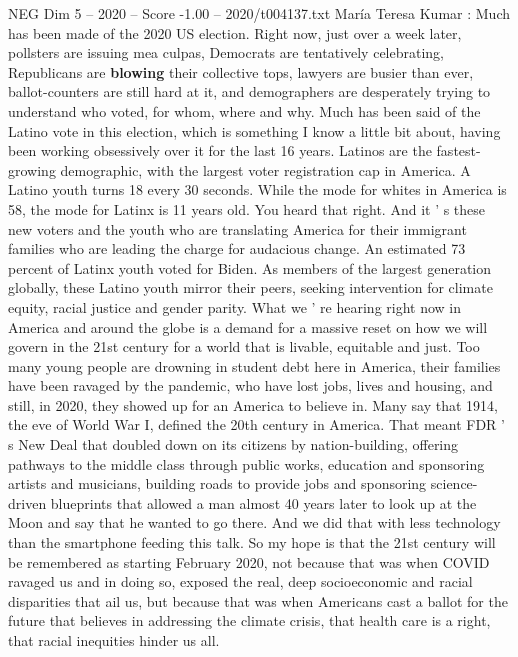 \begin{textsample}{NEG Dim 5 – 2020 – Score -1.00 – 2020/t004137.txt}  \label{ex:f5_neg_019}
María Teresa Kumar : Much has been made of the 2020 US election.
Right now, just over a week later, pollsters are issuing mea culpas, Democrats are tentatively celebrating, Republicans are \textbf{blowing} their collective tops, lawyers are busier than ever, ballot-counters are still hard at it, and demographers are desperately trying to understand who voted, for whom, where and why.
Much has been said of the Latino vote in this election, which is something I know a little bit about, having been working obsessively over it for the last 16 years.
Latinos are the fastest-growing demographic, with the largest voter registration cap in America.
A Latino youth turns 18 every 30 seconds.
While the mode for whites in America is 58, the mode for Latinx is 11 years old.
You heard that right.
And it ' s these new voters and the youth who are translating America for their immigrant families who are leading the charge for audacious change.
An estimated 73 percent of Latinx youth voted for Biden.
As members of the largest generation globally, these Latino youth mirror their peers, seeking intervention for climate equity, racial justice and gender parity.
What we ' re hearing right now in America and around the globe is a demand for a massive reset on how we will govern in the 21st century for a world that is livable, equitable and just.
Too many young people are drowning in student debt here in America, their families have been ravaged by the pandemic, who have lost jobs, lives and housing, and still, in 2020, they showed up for an America to believe in.
Many say that 1914, the eve of World War I, defined the 20th century in America.
That meant FDR ' s New Deal that doubled down on its citizens by nation-building, offering pathways to the middle class through public works, education and sponsoring artists and musicians, building roads to provide jobs and sponsoring science-driven blueprints that allowed a man almost 40 years later to look up at the Moon and say that he wanted to go there.
And we did that with less technology than the smartphone feeding this talk.
So my hope is that the 21st century will be remembered as starting February 2020, not because that was when COVID ravaged us and in doing so, exposed the real, deep socioeconomic and racial disparities that ail us, but because that was when Americans cast a ballot for the future that believes in addressing the climate crisis, that health care is a right, that racial inequities hinder us all.

\end{textsample}
